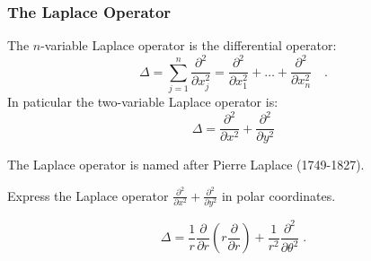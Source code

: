 \begin{frame}
\frametitle{The Laplace Operator}
\begin{definition}
The $n$-variable Laplace operator is the differential operator:
\[
\Delta=\sum\limits_{j=1}^n \frac{\partial^2 }{\partial x_j^2}=\frac{\partial^2 }{\partial x_1^2}+\dots +\frac{\partial^2 }{\partial x_n^2}\quad.
\]
In paticular the two-variable Laplace operator is:
\[
\Delta=\frac{\partial^2 }{\partial x^2} +\frac{\partial^2 }{\partial y^2}
\]
\end{definition}
The Laplace operator is named after Pierre Laplace (1749-1827).
\end{frame}

\begin{frame}
\begin{example}
Express the Laplace operator $\frac{\partial^2}{\partial x^2}+\frac{\partial^2}{\partial y^2}$ in polar coordinates.

$$
\Delta = \frac{1}{r}\frac{\partial}{\partial r} \left( r\frac{\partial }{\partial r} \right) +  \frac{1}{r^2}\frac{\partial^2 }{\partial \theta^2}\; .$$
\end{example}
\end{frame}